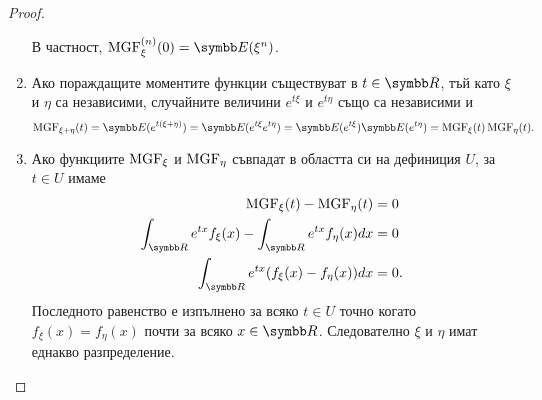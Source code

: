 \documentclass[
  headings=standardclasses,
  bibliography=totocnumbered,
]{scrartcl}
\begin{document}
\begin{proof}
\begin{enumerate}
    В частност, \( \MGF^{(n)}_\xi(0) = \Expect(\xi^n) \).

    \item Ако пораждащите моментите функции съществуват в \( t \in \R \), тъй като \( \xi \) и \( \eta \) са независими, случайните величини \( e^{t\xi} \) и \( e^{t\eta} \) също са независими и
    \begin{equation*}
      \MGF_{\xi + \eta}(t)
      =
      \Expect(e^{t(\xi + \eta)})
      =
      \Expect(e^{t\xi} e^{t\eta})
      =
      \Expect(e^{t\xi}) \Expect(e^{t\eta})
      =
      \MGF_\xi(t) \MGF_\eta(t).
    \end{equation*}

    \item Ако функциите \( \operatorname{MGF}_\xi \) и \( \operatorname{MGF}_\eta \) съвпадат в областта си на дефиниция \( U \), за \( t \in U \) имаме
    \begin{align*}
      \MGF_\xi(t) - \MGF_\eta(t) &= 0
      \\
      \int_{\R} e^{tx} f_\xi(x) - \int_{\R} e^{tx} f_\eta(x) dx &= 0
      \\
      \int_{\R} e^{tx} (f_\xi(x) - f_\eta(x)) dx &= 0.
    \end{align*}
    Последното равенство е изпълнено за всяко \( t \in U \) точно когато \( f_\xi(x) = f_\eta(x) \) почти за всяко \( x \in \R \). Следователно \( \xi \) и \( \eta \) имат еднакво разпределение.
  \end{enumerate}
\end{proof}
\end{document}
